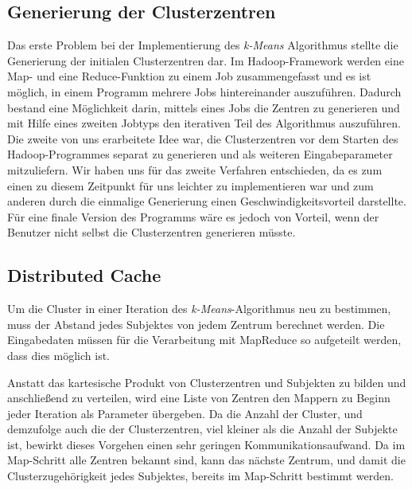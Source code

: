 \documentclass[a4paper]{llncs}
\begin{document}
\subsection{Generierung der Clusterzentren}
Das erste Problem bei der Implementierung des \emph{k-Means} Algorithmus stellte die Generierung der initialen Clusterzentren dar. Im Hadoop-Framework werden eine Map- und eine Reduce-Funktion zu einem Job zusammengefasst und es ist möglich, in einem Programm mehrere Jobs hintereinander auszuführen. Dadurch bestand eine Möglichkeit darin, mittels eines Jobs die Zentren zu generieren und mit Hilfe eines zweiten Jobtyps den iterativen Teil des Algorithmus auszuführen. Die zweite von uns erarbeitete Idee war, die Clusterzentren vor dem Starten des Hadoop-Programmes separat zu generieren und als weiteren Eingabeparameter mitzuliefern. Wir haben uns für das zweite Verfahren entschieden, da es zum einen zu diesem Zeitpunkt für uns leichter zu implementieren war und zum anderen durch die einmalige Generierung einen Geschwindigkeitsvorteil darstellte. Für eine finale Version des Programms wäre es jedoch von Vorteil, wenn der Benutzer nicht selbst die Clusterzentren generieren müsste.


\subsection{Distributed Cache}

Um die Cluster in einer Iteration des \emph{k-Means}-Algorithmus neu zu bestimmen, muss der Abstand jedes Subjektes von jedem Zentrum berechnet werden. Die Eingabedaten müssen für die Verarbeitung mit MapReduce so aufgeteilt werden, dass dies möglich ist.

Anstatt das kartesische Produkt von Clusterzentren und Subjekten zu bilden und anschließend zu verteilen, wird eine Liste von Zentren den Mappern zu Beginn jeder Iteration als Parameter übergeben. Da die Anzahl der Cluster, und demzufolge auch die der Clusterzentren, viel kleiner als die Anzahl der Subjekte ist, bewirkt dieses Vorgehen einen sehr geringen Kommunikationsaufwand. Da im Map-Schritt alle Zentren bekannt sind, kann das nächste Zentrum, und damit die Clusterzugehörigkeit jedes Subjektes, bereits im Map-Schritt bestimmt werden. 
\end{document}
